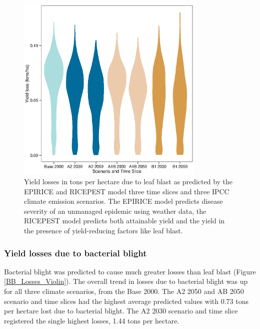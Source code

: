 \documentclass[preprint,12pt]{elsarticle}
\begin{document}
\begin{figure}[H]
  \includegraphics[width = 90mm]{Figures/LB_Losses_Violin}
  \caption{Yield losses in tons per hectare due to leaf blast as predicted by the EPIRICE and RICEPEST model three time slices and three IPCC climate emission scenarios. The EPIRICE model predicts disease severity of an unmanaged epidemic using weather data, the RICEPEST model predicts both attainable yield and the yield in the presence of yield-reducing factors like leaf blast.}
  \label{LB_Losses_Violin}
\end{figure}

\subsubsection{Yield losses due to bacterial blight}
Bacterial blight was predicted to cause much greater losses than leaf blast (Figure \ref{BB_Losses_Violin}). The overall trend in losses due to bacterial blight was up for all three climate scenarios, from the Base 2000. The A2 2050 and AB 2050 scenario and time slices had the highest average predicted values with 0.73 tons per hectare lost due to bacterial blight. The A2 2030 scenario and time slice registered the single highest losses, 1.44 tons per hectare.
\end{document}
